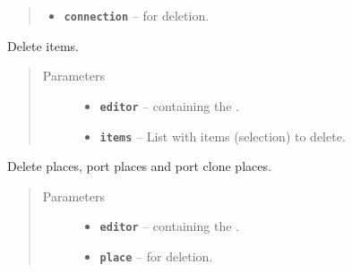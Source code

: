 \documentclass[a4paper,10pt,english]{sphinxmanual}
\begin{document}
\begin{fulllineitems}
\begin{fulllineitems}
\begin{quote}
\begin{description}
\begin{itemize}
\item {} 
\textbf{\texttt{connection}} --  for deletion.

\end{itemize}

\end{description}\end{quote}

\end{fulllineitems}


\begin{fulllineitems}
\label{gui_link:gui.DiagramEditor.DiagramEditor.deleteItems}
Delete items.
\begin{quote}\begin{description}
\item[{Parameters}] \leavevmode\begin{itemize}
\item {} 
\textbf{\texttt{editor}} --  containing the .

\item {} 
\textbf{\texttt{items}} -- List with items (selection) to delete.

\end{itemize}

\end{description}\end{quote}

\end{fulllineitems}


\begin{fulllineitems}
\label{gui_link:gui.DiagramEditor.DiagramEditor.deletePlace}
Delete places, port places and port clone places.
\begin{quote}\begin{description}
\item[{Parameters}] \leavevmode\begin{itemize}
\item {} 
\textbf{\texttt{editor}} --  containing the .

\item {} 
\textbf{\texttt{place}} --  for deletion.


\end{itemize}
\end{description}
\end{quote}
\end{fulllineitems}
\end{fulllineitems}
\end{document}
